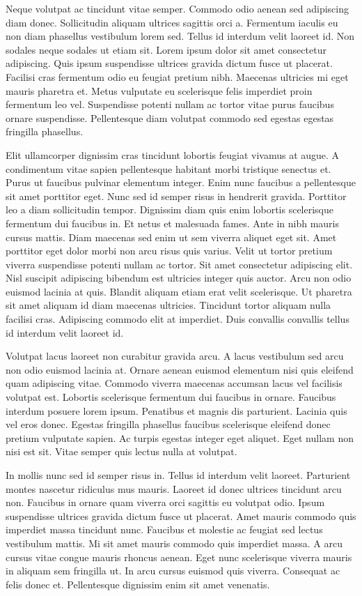 \documentclass[11pt,a4paper]{article}
\begin{document}
Neque volutpat ac tincidunt vitae semper. Commodo odio aenean sed adipiscing diam donec. Sollicitudin aliquam ultrices sagittis orci a. Fermentum iaculis eu non diam phasellus vestibulum lorem sed. Tellus id interdum velit laoreet id. Non sodales neque sodales ut etiam sit. Lorem ipsum dolor sit amet consectetur adipiscing. Quis ipsum suspendisse ultrices gravida dictum fusce ut placerat. Facilisi cras fermentum odio eu feugiat pretium nibh. Maecenas ultricies mi eget mauris pharetra et. Metus vulputate eu scelerisque felis imperdiet proin fermentum leo vel. Suspendisse potenti nullam ac tortor vitae purus faucibus ornare suspendisse. Pellentesque diam volutpat commodo sed egestas egestas fringilla phasellus.

Elit ullamcorper dignissim cras tincidunt lobortis feugiat vivamus at augue. A condimentum vitae sapien pellentesque habitant morbi tristique senectus et. Purus ut faucibus pulvinar elementum integer. Enim nunc faucibus a pellentesque sit amet porttitor eget. Nunc sed id semper risus in hendrerit gravida. Porttitor leo a diam sollicitudin tempor. Dignissim diam quis enim lobortis scelerisque fermentum dui faucibus in. Et netus et malesuada fames. Ante in nibh mauris cursus mattis. Diam maecenas sed enim ut sem viverra aliquet eget sit. Amet porttitor eget dolor morbi non arcu risus quis varius. Velit ut tortor pretium viverra suspendisse potenti nullam ac tortor. Sit amet consectetur adipiscing elit. Nisl suscipit adipiscing bibendum est ultricies integer quis auctor. Arcu non odio euismod lacinia at quis. Blandit aliquam etiam erat velit scelerisque. Ut pharetra sit amet aliquam id diam maecenas ultricies. Tincidunt tortor aliquam nulla facilisi cras. Adipiscing commodo elit at imperdiet. Duis convallis convallis tellus id interdum velit laoreet id.

Volutpat lacus laoreet non curabitur gravida arcu. A lacus vestibulum sed arcu non odio euismod lacinia at. Ornare aenean euismod elementum nisi quis eleifend quam adipiscing vitae. Commodo viverra maecenas accumsan lacus vel facilisis volutpat est. Lobortis scelerisque fermentum dui faucibus in ornare. Faucibus interdum posuere lorem ipsum. Penatibus et magnis dis parturient. Lacinia quis vel eros donec. Egestas fringilla phasellus faucibus scelerisque eleifend donec pretium vulputate sapien. Ac turpis egestas integer eget aliquet. Eget nullam non nisi est sit. Vitae semper quis lectus nulla at volutpat.

In mollis nunc sed id semper risus in. Tellus id interdum velit laoreet. Parturient montes nascetur ridiculus mus mauris. Laoreet id donec ultrices tincidunt arcu non. Faucibus in ornare quam viverra orci sagittis eu volutpat odio. Ipsum suspendisse ultrices gravida dictum fusce ut placerat. Amet mauris commodo quis imperdiet massa tincidunt nunc. Faucibus et molestie ac feugiat sed lectus vestibulum mattis. Mi sit amet mauris commodo quis imperdiet massa. A arcu cursus vitae congue mauris rhoncus aenean. Eget nunc scelerisque viverra mauris in aliquam sem fringilla ut. In arcu cursus euismod quis viverra. Consequat ac felis donec et. Pellentesque dignissim enim sit amet venenatis.
\end{document}

